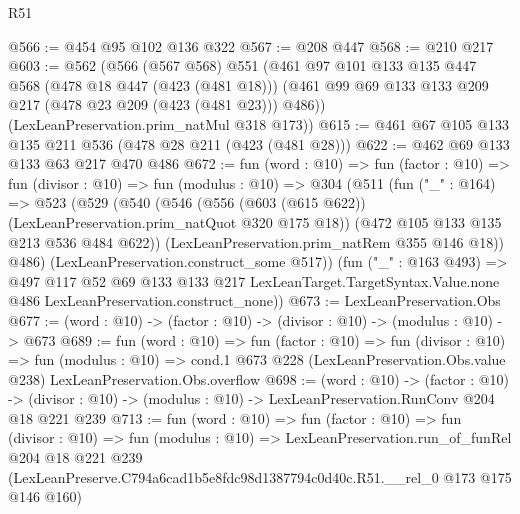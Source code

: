 \begin{lexlean}{R51}
\begin{coremodule}
@566 := @454 @95 @102 @136 @322
@567 := @208 @447
@568 := @210 @217
@603 := @562
    (@566
      (@567 @568)
      @551
      (@461
        @97
        @101
        @133
        @135
        @447
        @568
        (@478 @18 @447 (@423 (@481 @18)))
        (@461 @99 @69 @133 @133 @209 @217 (@478 @23 @209 (@423 (@481 @23))) @486))
      (LexLeanPreservation.prim_natMul @318 @173))
@615 := @461 @67 @105 @133 @135 @211 @536 (@478 @28 @211 (@423 (@481 @28)))
@622 := @462 @69 @133 @133 @63 @217 @470 @486
@672 := fun (word : @10) =>
  fun (factor : @10) =>
  fun (divisor : @10) =>
  fun (modulus : @10) =>
  @304
    (@511
      (fun ("_" : @164) =>
      @523
        (@529
          (@540
            (@546
              (@556 (@603 (@615 @622)) (LexLeanPreservation.prim_natQuot @320 @175 @18))
              (@472 @105 @133 @135 @213 @536 @484 @622))
            (LexLeanPreservation.prim_natRem @355 @146 @18))
          @486)
        (LexLeanPreservation.construct_some @517))
      (fun ("_" : @163 @493) =>
      @497
        @117
        @52
        @69
        @133
        @133
        @217
        LexLeanTarget.TargetSyntax.Value.none
        @486
        LexLeanPreservation.construct_none))
@673 := LexLeanPreservation.Obs
@677 := (word : @10) -> (factor : @10) -> (divisor : @10) -> (modulus : @10) -> @673
@689 := fun (word : @10) =>
  fun (factor : @10) =>
  fun (divisor : @10) =>
  fun (modulus : @10) =>
  cond.{1} @673 @228 (LexLeanPreservation.Obs.value @238) LexLeanPreservation.Obs.overflow
@698 := (word : @10) ->
  (factor : @10) ->
  (divisor : @10) -> (modulus : @10) -> LexLeanPreservation.RunConv @204 @18 @221 @239
@713 := fun (word : @10) =>
  fun (factor : @10) =>
  fun (divisor : @10) =>
  fun (modulus : @10) =>
  LexLeanPreservation.run_of_funRel
    @204
    @18
    @221
    @239
    (LexLeanPreserve.C794a6cad1b5e8fdc98d1387794c0d40c.R51.__rel_0 @173 @175 @146 @160)
\end{coremodule}
\end{lexlean}
